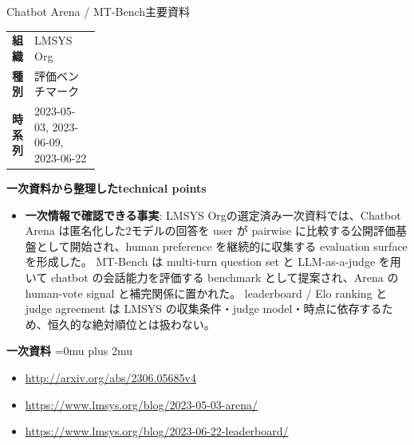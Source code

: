 \begin{technicalnote}{Chatbot Arena / MT-Bench}{主要資料}
\begingroup
\begin{tabularx}{\linewidth}{@{}>{\bfseries}p{0.22\linewidth}X@{}}
組織 & LMSYS Org \\
種別 & 評価ベンチマーク \\
時系列 & 2023-05-03, 2023-06-09, 2023-06-22 \\
\end{tabularx}
\smallskip
{\bfseries 一次資料から整理したtechnical points}
\begin{itemize}[leftmargin=1.5em,itemsep=0.35em]
\item \textbf{一次情報で確認できる事実}: LMSYS Orgの選定済み一次資料では、Chatbot Arena は匿名化した2モデルの回答を user が pairwise に比較する公開評価基盤として開始され、human preference を継続的に収集する evaluation surface を形成した。 MT-Bench は multi-turn question set と LLM-as-a-judge を用いて chatbot の会話能力を評価する benchmark として提案され、Arena の human-vote signal と補完関係に置かれた。 leaderboard / Elo ranking と judge agreement は LMSYS の収集条件・judge model・時点に依存するため、恒久的な絶対順位とは扱わない。
\end{itemize}
\begin{minipage}{\linewidth}
\begin{samepage}
{\bfseries 一次資料}
\begingroup\sloppy
\Urlmuskip=0mu plus 2mu\relax
\begin{itemize}[leftmargin=1.5em,itemsep=0.25em]
\item {\scriptsize\url{http://arxiv.org/abs/2306.05685v4}}
\item {\scriptsize\url{https://www.lmsys.org/blog/2023-05-03-arena/}}
\item {\scriptsize\url{https://www.lmsys.org/blog/2023-06-22-leaderboard/}}
\end{itemize}
\endgroup
\end{samepage}
\end{minipage}
\endgroup
\end{technicalnote}
\medskip

